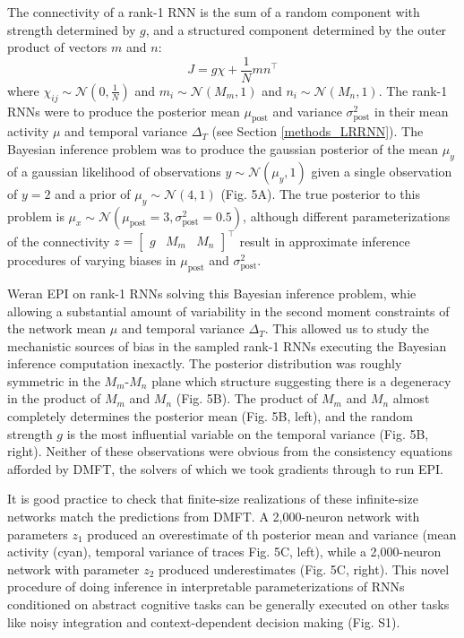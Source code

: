 \documentclass[11pt]{article}
\begin{document}
The connectivity of a rank-1 RNN is the sum of a random component with strength determined by $g$, and a structured component determined by the outer product of vectors $m$ and $n$:
\begin{equation}
J = g\chi + \frac{1}{N}mn^\top
\end{equation}
where $\chi_{ij} \sim \mathcal{N}(0, \frac{1}{N})$ and $m_i \sim \mathcal{N}(M_m, 1)$ and $n_i \sim \mathcal{N}(M_n, 1)$.  The rank-1 RNNs were to produce the posterior mean $\mu_{\text{post}}$ and variance $\sigma^2_{\text{post}}$ in their mean activity $\mu$ and temporal variance $\Delta_T$ (see Section \ref{methods_LRRNN}).  The Bayesian inference problem was to produce the gaussian posterior of the mean $\mu_y$ of a gaussian likelihood of observations $y \sim \mathcal{N}(\mu_y, 1)$ given a single observation of $y=2$ and a prior of $\mu_y \sim \mathcal{N}(4, 1)$ (Fig. 5A). The true posterior to this problem is $\mu_x \sim \mathcal{N}(\mu_{\text{post}}=3, \sigma^2_{\text{post}}=0.5)$, although different parameterizations of the connectivity $z = \begin{bmatrix} g & M_m & M_n \end{bmatrix}^\top$ result in approximate inference procedures of varying biases in $\mu_{\text{post}}$ and $\sigma^2_{\text{post}}$.

Weran EPI on rank-1 RNNs solving this Bayesian inference problem, whie allowing a substantial amount of variability in the second moment constraints of the network mean $\mu$ and temporal variance $\Delta_T$.  
This allowed us to study the mechanistic sources of bias in the sampled rank-1 RNNs executing the Bayesian inference computation inexactly.
The posterior distribution was roughly symmetric in the $M_m$-$M_n$ plane which structure suggesting there is a degeneracy in the product of $M_m$ and $M_n$ (Fig. 5B).  
The product of $M_m$ and $M_n$ almost completely determines the posterior mean (Fig. 5B, left), and the random strength $g$ is the most influential variable on the temporal variance (Fig. 5B, right). 
 Neither of these observations were obvious from the consistency equations afforded by DMFT, the solvers of which we took gradients through to run EPI.  
 
It is good practice to check that finite-size realizations of these infinite-size networks match the predictions from DMFT.  A 2,000-neuron network with parameters $z_1$ produced an overestimate of th  posterior mean and variance (mean activity (cyan), temporal variance of traces Fig. 5C, left), while a 2,000-neuron network with parameter $z_2$ produced underestimates (Fig. 5C, right).  This novel procedure of doing inference in interpretable parameterizations of RNNs conditioned on abstract cognitive tasks can be generally executed on other tasks like noisy integration and context-dependent decision making (Fig. S1).
\end{document}
